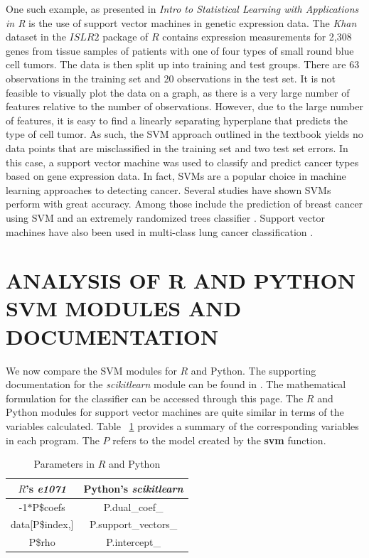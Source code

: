 \documentclass[12pt]{article}
\begin{document}
One such example, as presented in \textit{Intro to Statistical Learning with Applications in R} \citep{introstatlearning} is the use of support vector machines in genetic expression data. The \textit{Khan} dataset in the $ISLR2$ package of $R$ contains expression measurements for 2,308 genes from tissue samples of patients with one of four types of small round blue cell tumors. The data is then split up into training and test groups. There are 63 observations in the training set and 20 observations in the test set. It is not feasible to visually plot the data on a graph, as there is a very large number of features relative to the number of observations. However, due to the large number of features, it is easy to find a linearly separating hyperplane that predicts the type of cell tumor. As such, the SVM approach outlined in the textbook yields no data points that are misclassified in the training set and two test set errors. In this case, a support vector machine was used to classify and predict cancer types based on gene expression data. In fact, SVMs are a popular choice in machine learning approaches to detecting cancer. Several studies have shown SVMs perform with great accuracy. Among those include the prediction of breast cancer using SVM and an extremely randomized trees classifier \cite{breastcancer}. Support vector machines have also been used in multi-class lung cancer classification \cite{lungcancer}.

\section{ANALYSIS OF R AND PYTHON SVM MODULES AND DOCUMENTATION}

We now compare the SVM modules for $R$ and Python. The supporting documentation for the \textit{scikitlearn} module can be found in \cite{scikit_svm}. The mathematical formulation for the classifier can be accessed through this page. The $R$ and Python modules for support vector machines are quite similar in terms of the variables calculated. Table ~\ref{tab_r_python} provides a summary of the corresponding variables in each program. The $P$ refers to the model created by the \textbf{svm} function. 

\begin{table}[H]
    \centering
    \def\arraystretch{1.5}
    \begin{tabular}{c|c}
        $R$'s \textit{e1071} & Python's \textit{scikitlearn} \\
        \hline
        -1$*$P\$coefs & P.dual\_coef\_ \\
        data[P\$index,] & P.support\_vectors\_ \\
        P\$rho & P.intercept\_
    \end{tabular}
    \caption{Parameters in $R$ and Python}
    \label{tab_r_python}
\end{table}
\end{document}

